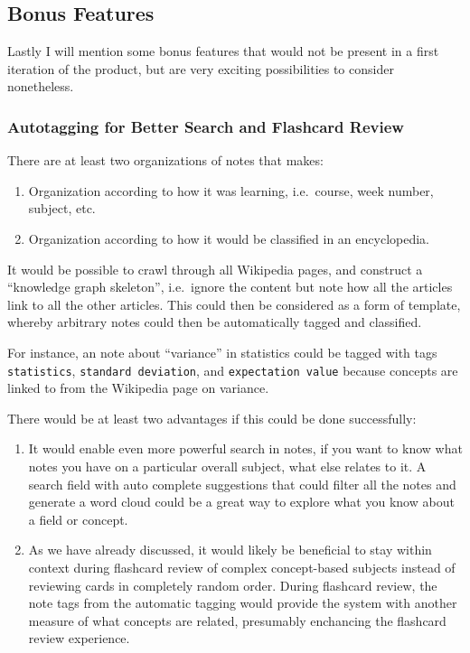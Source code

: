 \subsection{Bonus Features}\label{bonus-features}

Lastly I will mention some bonus features that would not be present in a
first iteration of the product, but are very exciting possibilities to
consider nonetheless.

\subsubsection{Autotagging for Better Search and Flashcard
Review}\label{autotagging-for-better-search-and-flashcard-review}

There are at least two organizations of notes that makes:

\begin{enumerate}
\def\labelenumi{\arabic{enumi}.}
\tightlist
\item
  Organization according to how it was learning, i.e.~course, week
  number, subject, etc.
\item
  Organization according to how it would be classified in an
  encyclopedia.
\end{enumerate}

It would be possible to crawl through all Wikipedia pages, and construct
a ``knowledge graph skeleton'', i.e.~ignore the content but note how all
the articles link to all the other articles. This could then be
considered as a form of template, whereby arbitrary notes could then be
automatically tagged and classified.

For instance, an note about ``variance'' in statistics could be tagged
with tags \texttt{statistics}, \texttt{standard\ deviation}, and
\texttt{expectation\ value} because concepts are linked to from the
Wikipedia page on variance.

There would be at least two advantages if this could be done
successfully:

\begin{enumerate}
\def\labelenumi{\arabic{enumi}.}
\tightlist
\item
  It would enable even more powerful search in notes, if you want to
  know what notes you have on a particular overall subject, what else
  relates to it. A search field with auto complete suggestions that
  could filter all the notes and generate a word cloud could be a great
  way to explore what you know about a field or concept.
\item
  As we have already discussed, it would likely be beneficial to stay
  within context during flashcard review of complex concept-based
  subjects instead of reviewing cards in completely random order. During
  flashcard review, the note tags from the automatic tagging would
  provide the system with another measure of what concepts are related,
  presumably enchancing the flashcard review experience.
\end{enumerate}

